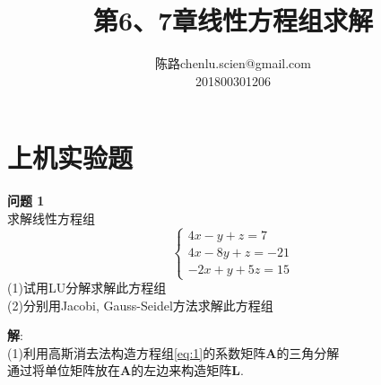 \documentclass[UTF8]{ctexart}
\makeatletter
\newenvironment{problem}[2][问题]
{\begin{mdframed}[backgroundcolor=gray!20] \textbf{#1 #2} \\}
	{\end{mdframed}}
\newcommand\assignmentNumber{6、7}
\newcommand\studentName{陈路}
\newcommand\studentEmail{chenlu.scien@gmail.com}
\newcommand\studentNumber{201800301206}
\makeatother
\begin{document}
    \title{第\assignmentNumber 章\quad 线性方程组求解}
    \author{\name \studentName \email \studentEmail \\
    \studentNumber
    }\maketitle
\section{上机实验题}
\begin{problem}{1}
	求解线性方程组
	\begin{equation}
		\begin{cases}
			4x-y+z = 7 \\
			4x-8y+z = -21 \\
			-2x+y+5z = 15\label{eq:1} 
		\end{cases}
	\end{equation}
	(1)试用LU分解求解此方程组\\
	(2)分别用Jacobi, Gauss-Seidel方法求解此方程组
\end{problem}
\textbf{解}:\\
(1)利用高斯消去法构造方程组\ref{eq:1}的系数矩阵\textbf{A}的三角分解\\
通过将单位矩阵放在\textbf{A}的左边来构造矩阵\textbf{L}.
\end{document}
